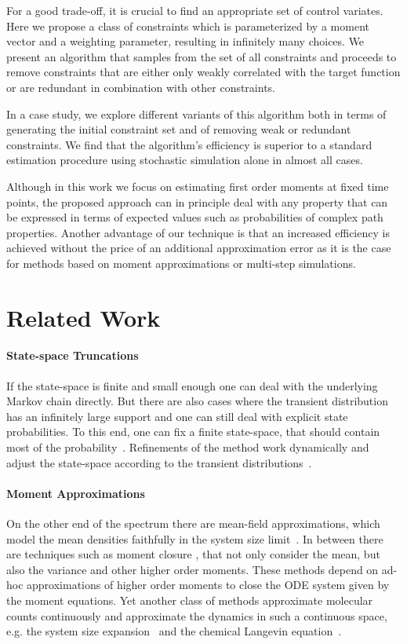 For a good trade-off, it is crucial to find an appropriate set of control variates.
Here we propose a class of constraints which is parameterized by a moment vector
and a weighting parameter, resulting in infinitely many choices.
We present an algorithm that samples from the set of all constraints and
proceeds to remove constraints that are either only weakly correlated with the
target function or are redundant in combination with other constraints.

In a case study, we explore different variants of this algorithm
both in terms of generating the initial constraint set and of
removing  weak or redundant constraints.
We find that the algorithm's efficiency is superior to a standard estimation procedure
using stochastic simulation alone
in almost all cases.

Although in this work we focus on  estimating first order moments at
fixed time points, the proposed approach can in principle deal with any property that can
be expressed in terms of expected values such as probabilities
of complex path properties.
Another advantage of our technique is that an increased efficiency is achieved without the price of an additional approximation error as it is the case for methods based on moment approximations or multi-step simulations.

\section{Related Work}\label{sec:cv:related}
\paragraph{State-space Truncations}
If the state-space is finite and small enough one can deal with the underlying Markov
chain directly.
But there are also  cases where the transient distribution has an infinitely large support
and one can still deal with explicit state probabilities.
To this end, one can fix a finite state-space, that should contain most of the
probability~\parencite{munsky2006finite}. Refinements of the method work
dynamically and adjust the state-space according to the transient
distributions~\parencite{andreychenko2011parameter,henzinger2009sliding,mateescu2010fast}.

\paragraph{Moment Approximations}
On the other end of the spectrum there are mean-field approximations, 
which model the mean densities faithfully in the system size limit~\parencite{bortolussi2013continuous}.
In between there are techniques such as moment closure \parencite{singh2006lognormal}, that
not only consider the mean, but also the variance and other higher order moments.
These methods depend on ad-hoc approximations of higher order moments to
close the \ac{ODE} system given by the moment equations.
Yet another class of methods approximate molecular counts continuously and approximate the dynamics in such a continuous space, e.g. the system size expansion~\parencite{van1992stochastic} and the
chemical Langevin equation~\parencite{gillespie2000chemical}.

